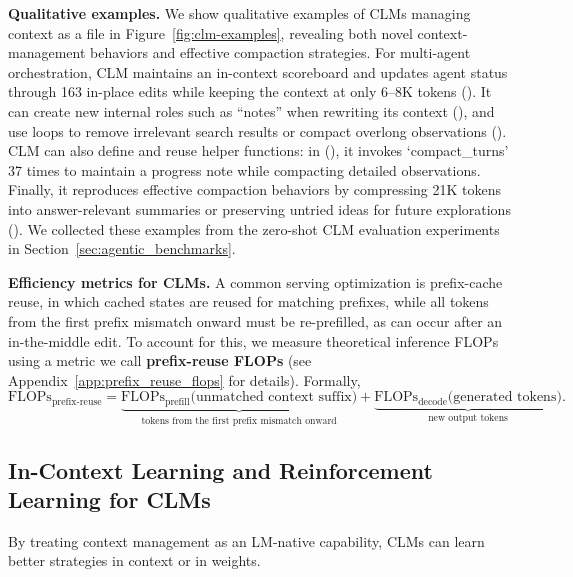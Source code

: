 \documentclass{fairmeta}
\newcommand{\clmhl}[1]{\textcolor{clmblue}{\textbf{#1}}}
\newcommand{\ours}{CLM\xspace}
\newcommand{\oursplural}{CLMs\xspace}
\begin{document}

\textbf{Qualitative examples.}
We show qualitative examples of \oursplural{} managing context as a file in Figure~\ref{fig:clm-examples}, revealing both novel context-management behaviors and effective compaction strategies. For multi-agent orchestration, \ours{} maintains an in-context scoreboard and updates agent status through 163 in-place edits while keeping the context at only 6--8K tokens (). It can create new internal roles such as ``notes'' when rewriting its context (), and use loops to remove irrelevant search results or compact overlong observations (). \ours{} can also define and reuse helper functions: in (), it invokes `compact\_turns' 37 times to maintain a progress note while compacting detailed observations. Finally, it reproduces effective compaction behaviors by compressing 21K tokens into answer-relevant summaries or preserving untried ideas for future explorations ().
We collected these examples from the zero-shot \ours{} evaluation experiments in Section~\ref{sec:agentic_benchmarks}.


\textbf{Efficiency metrics for \oursplural.}
A common serving optimization is prefix-cache reuse, in which cached states are reused for matching prefixes, while all tokens from the first prefix mismatch onward must be re-prefilled, as can occur after an in-the-middle edit. 
To account for this, we measure theoretical inference FLOPs using a metric we call \clmhl{prefix-reuse FLOPs} (see Appendix~\ref{app:prefix_reuse_flops} for details). Formally,
\begin{equation}\label{eq:prefix-reuse-flops}
\mathrm{FLOPs}_{\mathrm{prefix\text{-}reuse}}
=
\underbrace{
\mathrm{FLOPs}_{\mathrm{prefill}}
\bigl(\text{unmatched context suffix}\bigr)
}_{\text{tokens from the first prefix mismatch onward}}
+
\underbrace{
\mathrm{FLOPs}_{\mathrm{decode}}
\bigl(\text{generated tokens}\bigr)
}_{\text{new output tokens}}.
\end{equation}


\subsection{In-Context Learning and Reinforcement Learning for \oursplural}
\label{sec:method_learning}

By treating context management as an LM-native capability,
\oursplural can learn better strategies in context or in weights. 
\end{document}
